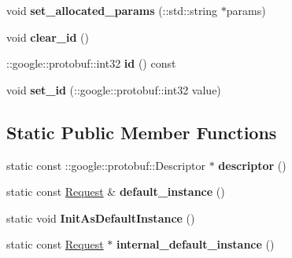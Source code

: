\begin{DoxyCompactItemize}
\mbox{\label{classcoappbrpc_1_1Request_aa7f19fbcc325f288b0d70b3e3eb55829}} 
void {\bfseries set\+\_\+allocated\+\_\+params} (\+::std\+::string $\ast$params)
\item 
\mbox{\label{classcoappbrpc_1_1Request_a687f7932f9718823e114a934d5d4a41f}} 
void {\bfseries clear\+\_\+id} ()
\item 
\mbox{\label{classcoappbrpc_1_1Request_a48a39437866e9a8f9ee50759966cbc7e}} 
\+::google\+::protobuf\+::int32 {\bfseries id} () const
\item 
\mbox{\label{classcoappbrpc_1_1Request_a6d5f7f9cbd2757ff922ed6339055dc5b}} 
void {\bfseries set\+\_\+id} (\+::google\+::protobuf\+::int32 value)
\end{DoxyCompactItemize}
\subsection*{Static Public Member Functions}
\begin{DoxyCompactItemize}
\item 
\mbox{\label{classcoappbrpc_1_1Request_acee20e2a177227b514ff52c82cc23cdf}} 
static const \+::google\+::protobuf\+::\+Descriptor $\ast$ {\bfseries descriptor} ()
\item 
\mbox{\label{classcoappbrpc_1_1Request_a24d20d232627a8baaf01bb0ed9266c46}} 
static const \hyperlink{classcoappbrpc_1_1Request}{Request} \& {\bfseries default\+\_\+instance} ()
\item 
\mbox{\label{classcoappbrpc_1_1Request_aa650d4a3da3187eb70e13f0d7931bad6}} 
static void {\bfseries Init\+As\+Default\+Instance} ()
\item 
\mbox{\label{classcoappbrpc_1_1Request_a6f72b785009d065f41981a2a7ad8f294}} 
static const \hyperlink{classcoappbrpc_1_1Request}{Request} $\ast$ {\bfseries internal\+\_\+default\+\_\+instance} ()
\end{DoxyCompactItemize}
